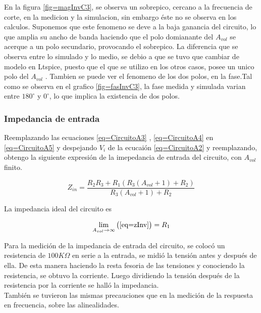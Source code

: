 \documentclass[../../main.tex]{subfiles}
\begin{document}
En la figura \ref{fig=magInvC3}, se observa un sobrepico, cercano a la frecuencia de corte, en la medicion y la simulacion, sin embargo éste no se observa en los calculos. Suponemos que este fenomeno se deve a la baja ganancia del circuito, lo que amplia su ancho de banda haciendo que el polo domianante del  
$A_{vol}$ se acerque a un polo secundario, provocando el sobrepico.
La diferencia que se observa entre lo simulado y lo medio, se debio a que se tuvo que cambiar de modelo en Ltspice, puesto que el que se utilizo en los otros casos, posee un unico polo del $A_{vol}$ .
Tambien se puede ver el fenomeno de los dos polos, en la fase.Tal como se observa en el grafico \ref{fig=fasInvC3}, la fase medida y simulada varian entre  $180^{\circ}$ y $0^{\circ}$, lo que implica la existencia de dos polos.

\subsubsection{Impedancia de entrada}


Reemplazando las ecuaciones \ref{eq=CircuitoA3} , \ref{eq=CircuitoA4} en \ref{eq=CircuitoA5} y despejando $V_{i}$ de la ecucaión \ref{eq=CircuitoA2} y reemplazando, obtengo la siguiente expresión de la imepedancia de entrada del circuito, con $A_{vol}$ finito.

\begin{equation}
Z_{in}=\frac{R_{2} R_{3}+ R_{1} (R_{3}(A_{vol} +1)+R_{2} )}{R_{3}(A_{vol}+1)+R_{2}}\label{eq=zInv}
\end{equation}

La impedancia ideal del circuito es

$$ \lim_{A_{vol}\to\infty} \big( \ref{eq=zInv} \big) =R_{1} $$

Para la medición de la impedancia de entrada del circuito, se colocó un resistencia de $100K \Omega$ en serie a la entrada, se midió la tensión antes y después de ella. De esta manera haciendo la resta fesoria de las tensiones y conociendo la resistencia, se obtuvo la corriente. Luego dividiendo la tensión después de la resistencia por la corriente se halló la impedancia.
\\
También se tuvieron las mismas precauciones que en la medición de la respuesta en frecuencia, sobre las alinealidades.
\end{document}
